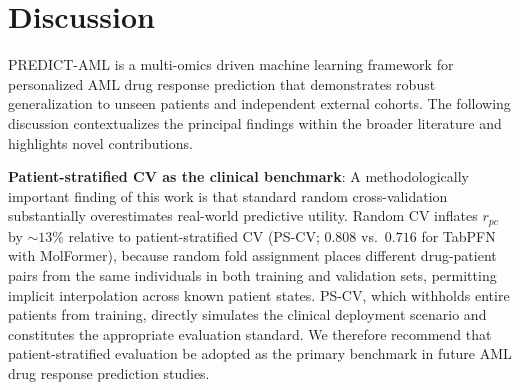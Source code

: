 \documentclass[pdflatex,sn-mathphys-num]{sn-jnl}
\theoremstyle{thmstyleone}
\theoremstyle{thmstyletwo}
\theoremstyle{thmstylethree}
\begin{document}

\section{Discussion}\label{sec4}
PREDICT-AML is a multi-omics driven machine learning framework for personalized AML drug response prediction that demonstrates robust generalization to unseen patients and independent external cohorts. The following discussion contextualizes the principal findings within the broader literature and highlights novel contributions.

\textbf{Patient-stratified CV as the clinical benchmark}: A methodologically important finding of this work is that standard random cross-validation substantially overestimates real-world predictive utility. Random CV inflates $r_{pc}$ by $\sim\!13\%$ relative to patient-stratified CV (PS-CV; $0.808$ vs.\ $0.716$ for TabPFN with MolFormer), because random fold assignment places different drug-patient pairs from the same individuals in both training and validation sets, permitting implicit interpolation across known patient states. PS-CV, which withholds entire patients from training, directly simulates the clinical deployment scenario and constitutes the appropriate evaluation standard. We therefore recommend that patient-stratified evaluation be adopted as the primary benchmark in future AML drug response prediction studies.
\end{document}

